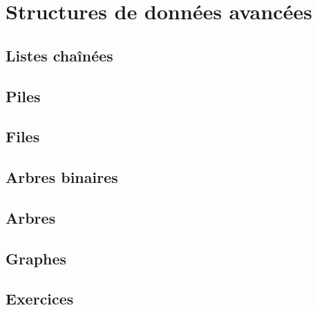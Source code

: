 \chapter{Structures de données avancées}
\section{Listes chaînées}
\section{ Piles}
\section{Files}
\section{Arbres binaires}
\section{Arbres}
\section{ Graphes}

\section{Exercices}